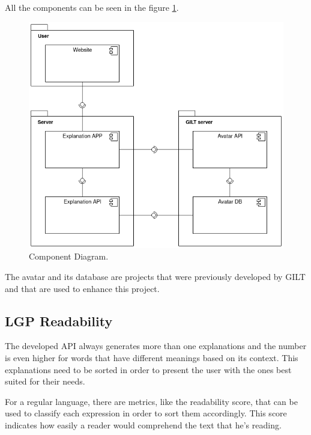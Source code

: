 \documentclass[runningheads]{llncs}
\begin{document}
All the components can be seen in the figure \ref{fig1}.

\begin{figure}[ht]
\centering
\includegraphics[scale=0.4]{component_diagram.png}
\caption{Component Diagram.} \label{fig1}
\end{figure}

The avatar and its database are projects that were previously developed by GILT and that are used to enhance this project.

%

\subsection{LGP Readability}

The developed API always generates more than one explanations and the number is even higher for words that have different meanings based on its context.
This explanations need to be sorted in order to present the user with the ones best suited for their needs.

For a regular language, there are metrics, like the readability score, that can be used to classify each expression in order to sort them accordingly.
This score indicates how easily a reader would comprehend the text that he's reading.
\end{document}
